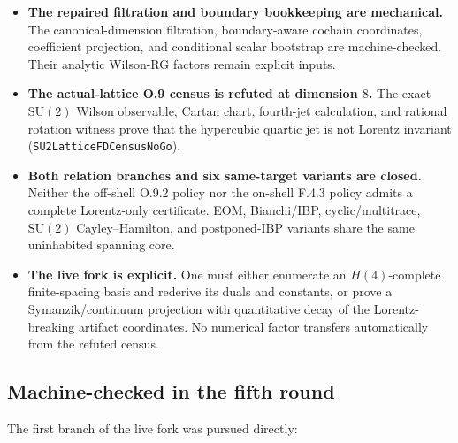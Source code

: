 \documentclass[11pt]{article}
\theoremstyle{definition}
\begin{document}
\begin{itemize}
  \item \textbf{The repaired filtration and boundary bookkeeping are
    mechanical.} The canonical-dimension filtration, boundary-aware cochain
    coordinates, coefficient projection, and conditional scalar bootstrap are
    machine-checked. Their analytic Wilson-RG factors remain explicit inputs.
  \item \textbf{The actual-lattice O.9 census is refuted at dimension $8$.}
    The exact $\mathrm{SU}(2)$ Wilson observable, Cartan chart, fourth-jet
    calculation, and rational rotation witness prove that the hypercubic
    quartic jet is not Lorentz invariant
    (\texttt{SU2LatticeFDCensusNoGo}).
  \item \textbf{Both relation branches and six same-target variants are
    closed.} Neither the off-shell O.9.2 policy nor the on-shell F.4.3 policy
    admits a complete Lorentz-only certificate. EOM, Bianchi/IBP,
    cyclic/multitrace, $\mathrm{SU}(2)$ Cayley--Hamilton, and postponed-IBP
    variants share the same uninhabited spanning core.
  \item \textbf{The live fork is explicit.} One must either enumerate an
    $H(4)$-complete finite-spacing basis and rederive its duals and constants,
    or prove a Symanzik/continuum projection with quantitative decay of the
    Lorentz-breaking artifact coordinates. No numerical factor transfers
    automatically from the refuted census.
\end{itemize}

\subsection*{Machine-checked in the fifth round}

The first branch of the live fork was pursued directly:
\end{document}
